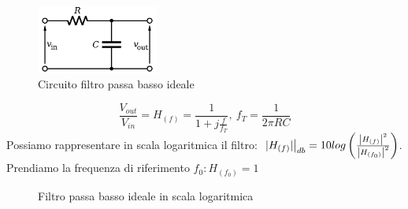             \begin{figure}[H]
                \centering
                \includegraphics[width=4cm]{media/1st_Order_Lowpass_Filter_RC.png}
                \caption{Circuito filtro passa basso ideale}
                \label{fig:circuito filtro passa basso ideale}
            \end{figure}
            \[
                \frac{V_{out}}{V_{in}} = H_{(f)} = \frac{1}{1+j\frac{f}{f_T}},\ f_T = \frac{1}{2\pi RC}
            \] 
            Possiamo rappresentare in scala logaritmica il filtro: $\eval*{|H_{(f)}|}_{db} = 10log\left( \frac{\left|H_{(f)}\right|^2}{\left|H_{(f_0)}\right|^2} \right)$.
            Prendiamo la frequenza di riferimento $f_0: H_{(f_0)} = 1$
            \begin{figure}[H]
                \centering
                \caption{Filtro passa basso ideale in scala logaritmica}
                \label{fig:LP filter logartithm}
            \end{figure} 
            
